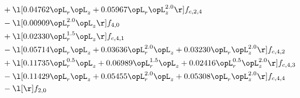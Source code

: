 \begin{alignat}{2}
& + \l[  0.04762 \opL_r \opL_z +  0.05967 \opL_r \opL_z^{2.0}  \r] f_{c,2,4} \nonumber \\ 
& - \l[  0.00909 \opL_r^{2.0} \opL_z  \r] f_{4,0} \nonumber \\ 
& + \l[  0.02330 \opL_r^{1.5} \opL_z  \r] f_{c,4,1} \nonumber \\ 
& - \l[  0.05714 \opL_r \opL_z +  0.03636 \opL_r^{2.0} \opL_z +  0.03230 \opL_r \opL_z^{2.0}  \r] f_{c,4,2} \nonumber \\ 
& + \l[  0.11735 \opL_r^{0.5} \opL_z +  0.06989 \opL_r^{1.5} \opL_z +  0.02416 \opL_r^{0.5} \opL_z^{2.0}  \r] f_{c,4,3} \nonumber \\ 
& - \l[  0.11429 \opL_r \opL_z +  0.05455 \opL_r^{2.0} \opL_z +  0.05308 \opL_r \opL_z^{2.0}  \r] f_{c,4,4} \nonumber \\ 
& - \l[  \r] f_{2,0} \nonumber \\ 
\end{alignat} 


